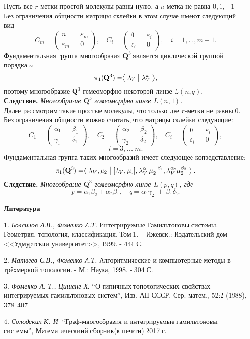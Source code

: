 Пусть все $r$-метки простой молекулы равны нулю, а $n$-метка не равна $0, 1, -1$.
Без ограничения общности матрицы склейки в этом случае имеют следующий вид:
$$
C_m = \begin{pmatrix} n && \varepsilon_m \\ \varepsilon_m && 0 \end{pmatrix}, \quad C_i = \begin{pmatrix} 0 && \varepsilon_i \\ \varepsilon_i && 0 \end{pmatrix},\quad i = 1,\dots, m-1.
$$
Фундаментальная группа многообразия $\mathbf{Q}^3$ является циклической группой порядка $n$
$$
\pi_1(\mathbf{Q}^3) = \bigm\langle \lambda_V \bigm| \lambda_V^n \bigm\rangle,
$$
поэтому многообразие $\mathbf{Q}^3$ гомеоморфно некоторой линзе $L(n, q)$.
\\

\textbf{Следствие.}{ \it
Многообразие $\mathbf{Q}^3$ гомеоморфно линзе $L(n, 1)$.}
\\

Далее рассмотрим такие простые молекулы, что только две $r$-метки не равны 0.
Без ограничения общности можно считать, что матрицы склейки следующие:
$$
C_1 = \begin{pmatrix} \alpha_1 && \beta_1 \\ \gamma_1 && \delta_1 \end{pmatrix}, \quad
C_2 = \begin{pmatrix} \alpha_2 && \beta_2 \\ \gamma_2 && \delta_2 \end{pmatrix},
\quad C_i = \begin{pmatrix} 0 && \varepsilon_i \\ \varepsilon_i && 0 \end{pmatrix},
$$
$$
i = 3,\dots, m.
$$
Фундаментальная группа таких многообразий имеет следующее копредставление:
$$
\pi_1(\mathbf{Q}^3) = \bigm\langle \lambda_V, \mu_2 \bigm|  [\lambda_V, \mu_1],
\lambda^{\alpha_1}_V\mu^{-\beta_1}_2, \lambda^{\alpha_2}_V\mu^{\beta_2}_2 \bigm\rangle.
$$
\textbf{Следствие.} {\it
Многообразие $\mathbf{Q}^3$ гомеоморфно линзе $L(p, q)$, где
$$
p = \alpha_1\beta_2 + \alpha_2\beta_1, \quad q = \alpha_1\gamma_2~+~\beta_1\delta_2.
$$
}
\smallskip \centerline{\bf Литература}\nopagebreak

1. {\it Болсинов А.В., Фоменко А.Т.}  Интегрируемые Гамильтоновы системы. Геометрия, топология, классификация. Том 1. -- Ижевск.: Издательский дом <<Удмуртский университет>>, 1999. - 444 С.

2. {\it Матвеев С.В., Фоменко А.Т.} Алгоритмические и компьютерные методы в трёхмерной топологии.  - М.: Наука, 1998. - 304 С.

3. {\it Фоменко А. Т., Цишанг Х.} “О типичных топологических свойствах интегрируемых гамильтоновых систем”, Изв. АН СССР. Сер. матем., 52:2 (1988), 378–407

4. {\it Солодских К. И.} “Граф-многообразия и интегрируемые гамильтоновы системы”, Математическиий сборник(в печати) 2017 г.


